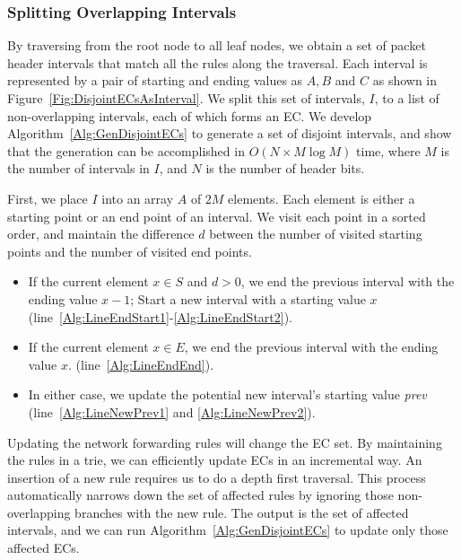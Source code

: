 \subsubsection{Splitting Overlapping Intervals}
By traversing from the root node to all leaf nodes, we obtain a set of packet header intervals that match all the rules along the traversal. Each interval is represented by a pair of starting and ending values as $A, B$ and $C$ as shown in Figure~\ref{Fig:DisjointECsAsInterval}. We split this set of intervals, $I$, to a list of non-overlapping intervals, each of which forms an EC. %
We develop Algorithm~\ref{Alg:GenDisjointECs} to generate a set of disjoint intervals, and show that the generation can be accomplished in $O(N \times M\log M)$ time,
where $M$ is the number of intervals in $I$, and $N$ is the number of header bits.

First, we place $I$ into an array $A$ of $2M$ elements. Each element is either a starting point or an end point of an interval. %
We visit each point in a sorted order, and maintain the difference $d$ between the number of visited starting points and the number of visited end points.
\begin{itemize}
\item If the current element $x \in S$ and $d > 0$,
        we end the previous interval with the ending value $x - 1$;
        Start a new interval with a starting value $x$
        (line~\ref{Alg:LineEndStart1}-\ref{Alg:LineEndStart2}).
\item If the current element $x \in E$, we end the previous interval with the ending value $x$.
        (line~\ref{Alg:LineEndEnd}).
\item In either case, we update the potential new interval's starting value \textit{prev}
        (line~\ref{Alg:LineNewPrev1} and \ref{Alg:LineNewPrev2}).
\end{itemize}

Updating the network forwarding rules will change the EC set.
By maintaining the rules in a trie, we can efficiently update ECs in an incremental way. An insertion of a new rule requires us to do a depth first traversal. This process automatically narrows down the set of affected rules by ignoring those non-overlapping branches with the new rule.
The output is the set of affected intervals, and we can run Algorithm~\ref{Alg:GenDisjointECs} to update only those affected ECs.

